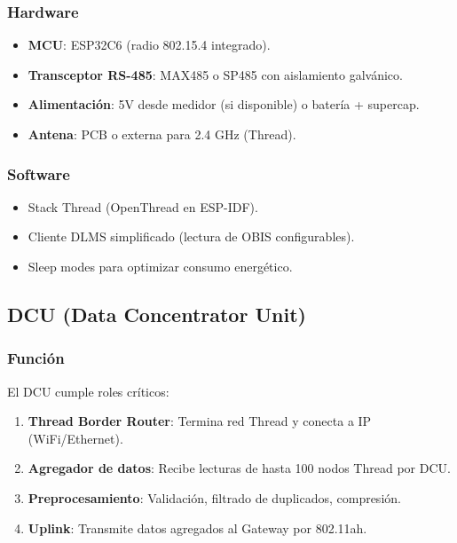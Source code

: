 \subsubsection{Hardware}

\begin{itemize}
    \item \textbf{MCU}: ESP32C6 (radio 802.15.4 integrado).
    \item \textbf{Transceptor RS-485}: MAX485 o SP485 con aislamiento galvánico.
    \item \textbf{Alimentación}: 5V desde medidor (si disponible) o batería + supercap.
    \item \textbf{Antena}: PCB o externa para 2.4 GHz (Thread).
\end{itemize}

\subsubsection{Software}

\begin{itemize}
    \item Stack Thread (OpenThread en ESP-IDF).
    \item Cliente DLMS simplificado (lectura de OBIS configurables).
    \item Sleep modes para optimizar consumo energético.
\end{itemize}

\subsection{DCU (Data Concentrator Unit)}

\subsubsection{Función}

El DCU cumple roles críticos:
\begin{enumerate}
    \item \textbf{Thread Border Router}: Termina red Thread y conecta a IP (WiFi/Ethernet).
    \item \textbf{Agregador de datos}: Recibe lecturas de hasta 100 nodos Thread por DCU.
    \item \textbf{Preprocesamiento}: Validación, filtrado de duplicados, compresión.
    \item \textbf{Uplink}: Transmite datos agregados al Gateway por 802.11ah.
\end{enumerate}

